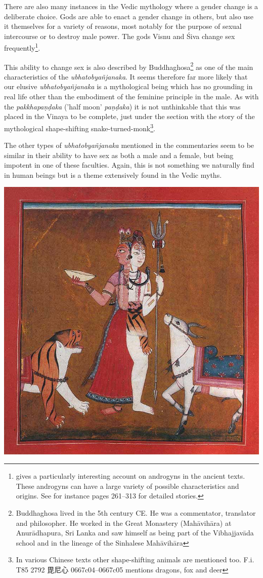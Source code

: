 There are also many instances in the Vedic mythology where a gender change is a deliberate choice. Gods are able to enact a gender change in others, but also use it themselves for a variety of reasons, most notably for the purpose of sexual intercourse or to destroy male power. The gods Visnu and Śiva change sex frequently\footnote{\cite{wendy} gives a particularly interesting account on androgyns in the ancient texts. These androgyns can have a large variety of possible characteristics and origins. See for instance pages 261–313 for detailed stories.}.

This ability to change sex is also described by Buddhaghosa\footnote{Buddhaghosa lived in the 5th century CE. He was a commentator, translator and philosopher. He worked in the Great Monastery (Mahāvihāra) at Anurādhapura, Sri Lanka and saw himself as being part of the Vibhajjavāda school and in the lineage of the Sinhalese Mahāvihāra} as one of the main characteristics of the {\em ubhatob­yañ­janaka}. It seems therefore far more likely that our elusive {\em ubhatob­yañ­janaka} is a mythological being which has no grounding in real life other than the embodiment of the feminine principle in the male. As with the {\em pakkhapaṇḍaka} ('half moon' {\em paṇḍaka}) it is not unthinkable that this was placed in the Vinaya to be complete, just under the section with the story of the mythological shape-shifting snake-turned-monk\footnote{In various Chinese texts other shape-shifting animals are mentioned too. F.i. T85 2792 毘尼心 0667c04–0667c05 mentions dragons, fox and deer}.

The other types of {\em ubhatob­yañ­janaka} mentioned in the commentaries seem to be similar in their ability to have sex as both a male and a female, but being impotent in one of these faculties. Again, this is not something we naturally find in human beings but is a theme extensively found in the Vedic myths.

\bigskip
\includegraphics[width=\textwidth]{androgyne.jpg}

